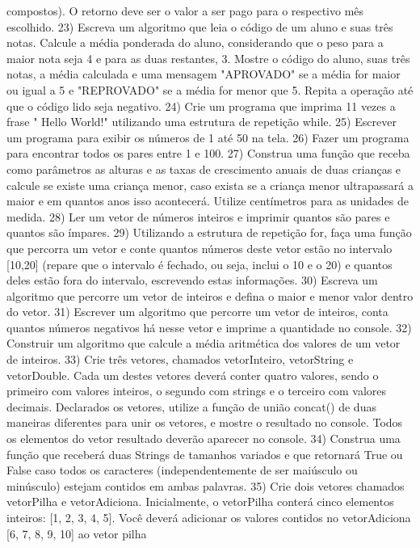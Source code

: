 compostos). O retorno deve ser o valor a ser pago para o respectivo mês escolhido.
23) Escreva um algoritmo que leia o código de um aluno e suas três notas. Calcule a média ponderada do
aluno, considerando que o peso para a maior nota seja 4 e para as duas restantes, 3. Mostre o código do
aluno, suas três notas, a média calculada e uma mensagem "APROVADO" se a média for maior ou igual a 5 e
"REPROVADO" se a média for menor que 5. Repita a operação até que o código lido seja negativo.
24) Crie um programa que imprima 11 vezes a frase " Hello World!" utilizando uma estrutura de repetição while.
25) Escrever um programa para exibir os números de 1 até 50 na tela.
26) Fazer um programa para encontrar todos os pares entre 1 e 100.
27) Construa uma função que receba como parâmetros as alturas e as taxas de crescimento anuais de duas
crianças e calcule se existe uma criança menor, caso exista se a criança menor ultrapassará a maior e em
quantos anos isso acontecerá. Utilize centímetros para as unidades de medida.
28) Ler um vetor de números inteiros e imprimir quantos são pares e quantos são ímpares.
29) Utilizando a estrutura de repetição for, faça uma função que percorra um vetor e conte quantos números
deste vetor estão no intervalo [10,20] (repare que o intervalo é fechado, ou seja, inclui o 10 e o 20) e quantos
deles estão fora do intervalo, escrevendo estas informações.
30) Escreva um algoritmo que percorre um vetor de inteiros e defina o maior e menor valor dentro do vetor.
31) Escrever um algoritmo que percorre um vetor de inteiros, conta quantos números negativos há nesse vetor
e imprime a quantidade no console.
32) Construir um algoritmo que calcule a média aritmética dos valores de um vetor de inteiros.
33) Crie três vetores, chamados vetorInteiro, vetorString e vetorDouble. Cada um destes vetores deverá conter
quatro valores, sendo o primeiro com valores inteiros, o segundo com strings e o terceiro com valores decimais.
Declarados os vetores, utilize a função de união concat() de duas maneiras diferentes para unir os vetores, e
mostre o resultado no console. Todos os elementos do vetor resultado deverão aparecer no console.
34) Construa uma função que receberá duas Strings de tamanhos variados e que retornará True ou False caso
todos os caracteres (independentemente de ser maiúsculo ou minúsculo) estejam contidos em ambas palavras.
35) Crie dois vetores chamados vetorPilha e vetorAdiciona. Inicialmente, o vetorPilha conterá cinco elementos
inteiros: [1, 2, 3, 4, 5]. Você deverá adicionar os valores contidos no vetorAdiciona [6, 7, 8, 9, 10] ao vetor pilha
